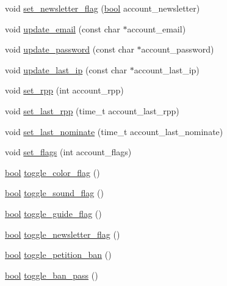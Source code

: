 \begin{DoxyCompactItemize}
void \hyperlink{classaccount_aeb0f7811000fa54ef1bcf2ba8a271921}{set\-\_\-newsletter\-\_\-flag} (\hyperlink{structs_8h_ad5c9d4ba3dc37783a528b0925dc981a0}{bool} account\-\_\-newsletter)
\item 
void \hyperlink{classaccount_a42fc12e16ea1ef1faff7b926a676cdf1}{update\-\_\-email} (const char $\ast$account\-\_\-email)
\item 
void \hyperlink{classaccount_a9e01213fc90e19ada49964f7876ea880}{update\-\_\-password} (const char $\ast$account\-\_\-password)
\item 
void \hyperlink{classaccount_a599986e5db6cebafb398690c7d4a98e6}{update\-\_\-last\-\_\-ip} (const char $\ast$account\-\_\-last\-\_\-ip)
\item 
void \hyperlink{classaccount_a7eccafbf3cb4466ea52ce68d320d2646}{set\-\_\-rpp} (int account\-\_\-rpp)
\item 
void \hyperlink{classaccount_ae40fb30ed0caf778d2f6b4582c1038f6}{set\-\_\-last\-\_\-rpp} (time\-\_\-t account\-\_\-last\-\_\-rpp)
\item 
void \hyperlink{classaccount_ace99c5470133f2226e7e211eb5367f48}{set\-\_\-last\-\_\-nominate} (time\-\_\-t account\-\_\-last\-\_\-nominate)
\item 
void \hyperlink{classaccount_ae92bb9373261e35aee1530697443afdc}{set\-\_\-flags} (int account\-\_\-flags)
\item 
\hyperlink{structs_8h_ad5c9d4ba3dc37783a528b0925dc981a0}{bool} \hyperlink{classaccount_a60bfacc5d1d16bb84fe77d64e473b9d8}{toggle\-\_\-color\-\_\-flag} ()
\item 
\hyperlink{structs_8h_ad5c9d4ba3dc37783a528b0925dc981a0}{bool} \hyperlink{classaccount_a808b325e109c6fb8dd16ae750b8a6aef}{toggle\-\_\-sound\-\_\-flag} ()
\item 
\hyperlink{structs_8h_ad5c9d4ba3dc37783a528b0925dc981a0}{bool} \hyperlink{classaccount_a432124b99cf1dd11873d546697a7cc8c}{toggle\-\_\-guide\-\_\-flag} ()
\item 
\hyperlink{structs_8h_ad5c9d4ba3dc37783a528b0925dc981a0}{bool} \hyperlink{classaccount_a0d8cdd02f9bebd123b369ada7dc83656}{toggle\-\_\-newsletter\-\_\-flag} ()
\item 
\hyperlink{structs_8h_ad5c9d4ba3dc37783a528b0925dc981a0}{bool} \hyperlink{classaccount_a31043390e24a539df779e806c1faaec5}{toggle\-\_\-petition\-\_\-ban} ()
\item 
\hyperlink{structs_8h_ad5c9d4ba3dc37783a528b0925dc981a0}{bool} \hyperlink{classaccount_af9ecc609d8f4fa1f84f7bf64e68a280c}{toggle\-\_\-ban\-\_\-pass} ()
\item 

\end{DoxyCompactItemize}
